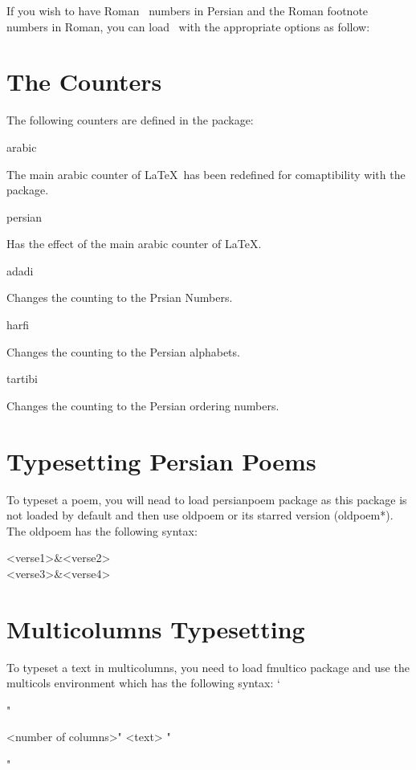 If you wish to have Roman \n\bibitem\ numbers in Persian and the Roman footnote numbers in Roman, you can load \XePersian\ with the appropriate options as follow:
  \Mac \usepackage[PersianBibNum,RomanFootNum]{xepersian}

\section{The Counters}
The following counters are defined in the package:
\begin{description}
\mitem arabic

The main {\UsageFont arabic} counter of \LaTeX\ has been redefined for comaptibility with the package.

\mitem persian

Has the effect of the main {\UsageFont arabic} counter of \LaTeX .

\mitem adadi

Changes the counting to the Prsian Numbers.

\mitem harfi

Changes the counting to the Persian alphabets.

\mitem tartibi

Changes the counting to the Persian ordering numbers.
\end{description}
\section{Typesetting Persian Poems}
To typeset a poem, you will nead to load \textsf{persianpoem} package as this package is not loaded by default and then use \textsf{oldpoem} or its starred version (\textsf{oldpoem*}). The \textsf{oldpoem} has the following syntax:
\begin{LVerb}
  \begin{oldpoem}
  <verse1>&<verse2>\\
  <verse3>&<verse4>\\
  \end{oldpoem}
\end{LVerb}
\section{Multicolumns Typesetting}
To typeset a text in multicolumns, you need to load \textsf{fmultico} package and use the \textsf{multicols} environment which has the following syntax:
\begingroup
\catcode`
\begin{Ex}
  "\begin{multicols}{<number of columns>}" 
  <text>
 "\end{multicols}"
\end{Ex}
\endgroup

